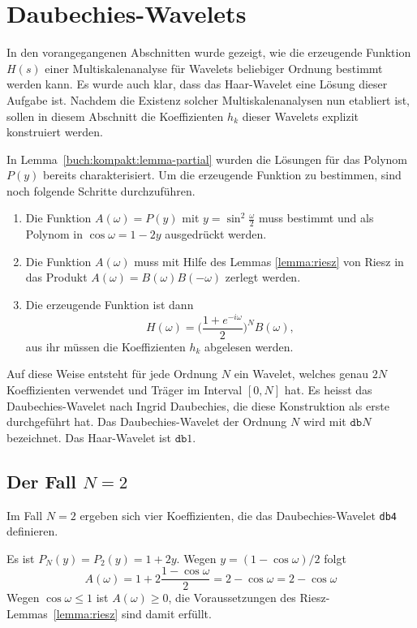 %
%
%
\section{Daubechies-Wavelets\label{section:daubechies}}
In den vorangegangenen Abschnitten wurde gezeigt, wie die erzeugende
Funktion $H(s)$ einer Multi\-skalenanalyse für Wavelets beliebiger
Ordnung bestimmt werden kann.
Es wurde auch klar, dass das Haar-Wavelet eine Lösung dieser Aufgabe
ist.
Nachdem die Existenz solcher Multiskalenana\-ly\-sen nun etabliert ist,
sollen in diesem Abschnitt die Koeffizienten $h_k$ dieser Wavelets
explizit konstruiert werden.

In Lemma~\ref{buch:kompakt:lemma-partial} wurden die Lösungen für das
Polynom $P(y)$ bereits charakterisiert.
Um die erzeugende Funktion zu bestimmen, sind noch folgende Schritte
durchzuführen.
\begin{enumerate}
\item
Die Funktion $A(\omega)=P(y)$ mit $y=\sin^2\frac{\omega}2$ muss
bestimmt und als Polynom in $\cos\omega=1-2y$ ausgedrückt werden.
\item
Die Funktion $A(\omega)$ muss mit Hilfe des Lemmas \ref{lemma:riesz}
von Riesz in das Produkt $A(\omega)=B(\omega)B(-\omega)$ zerlegt
werden.
\item
Die erzeugende Funktion ist dann
\[
H(\omega)
=
\biggl(
\frac{1+e^{-i\omega}}2
\biggr)^N
B(\omega),
\]
aus ihr müssen die Koeffizienten $h_k$ abgelesen werden.
\end{enumerate}
Auf diese Weise entsteht für jede Ordnung $N$ ein Wavelet, welches
genau $2N$ Koeffizienten verwendet und Träger im Interval
$[0,N]$ hat.
Es heisst das Daubechies-Wavelet
nach Ingrid Daubechies, die diese Konstruktion als erste durchgeführt hat.
Das Daubechies-Wavelet der Ordnung $N$ wird mit $\texttt{db}N$
bezeichnet.
Das Haar-Wavelet ist $\texttt{db}1$.

\subsection{Der Fall $N=2$}
Im Fall $N=2$ ergeben sich vier Koeffizienten, die das Daubechies-Wavelet
\texttt{db4} definieren.
%

Es ist $P_N(y)=P_2(y)=1+2y$.
Wegen $y=(1-\cos \omega)/2$ folgt
\[
A(\omega) = 1 + 2\frac{1-\cos\omega}2 = 2-\cos\omega
= 2- \cos\omega
\]
Wegen $\cos\omega\le 1$ ist $A(\omega) \ge 0$, die Voraussetzungen des
Riesz-Lemmas~\ref{lemma:riesz} sind damit erfüllt.

